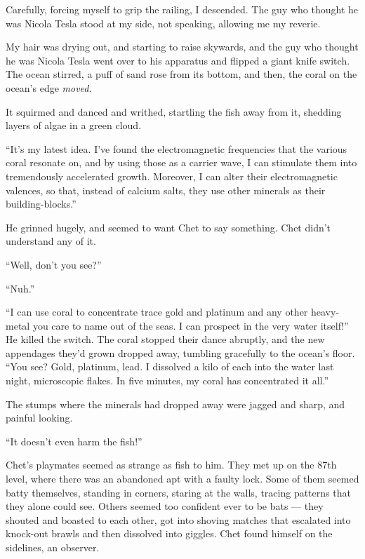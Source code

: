 Carefully, forcing myself to grip the railing, I descended. The guy
who thought he was Nicola Tesla stood at my side, not speaking,
allowing me my reverie.

My hair was drying out, and starting to raise skywards, and the guy
who thought he was Nicola Tesla went over to his apparatus and
flipped a giant knife switch. The ocean stirred, a puff of sand
rose from its bottom, and then, the coral on the ocean's edge
\emph{moved}.

It squirmed and danced and writhed, startling the fish away from
it, shedding layers of algae in a green cloud.

``It's my latest idea. I've found the electromagnetic frequencies that the 
various coral resonate on, and by using those as a carrier wave, I can 
stimulate them into tremendously accelerated growth. Moreover, I can alter 
their electromagnetic valences, so that, instead of calcium salts, they use 
other minerals as their building-blocks.''

He grinned hugely, and seemed to want Chet to say something. Chet
didn't understand any of it.

``Well, don't you see?''

``Nuh.''

``I can use coral to concentrate trace gold and platinum and any other 
heavy-metal you care to name out of the seas. I can prospect in the very water 
itself!''
He killed the switch. The coral stopped their dance abruptly, and
the new appendages they'd grown dropped away, tumbling gracefully
to the ocean's floor.
``You see? Gold, platinum, lead. I dissolved a kilo of each into the water last 
night, microscopic flakes. In five minutes, my coral has concentrated it all.''

The stumps where the minerals had dropped away were jagged and
sharp, and painful looking.

``It doesn't even harm the fish!''

\tb

Chet's playmates seemed as strange as fish to him. They met up on
the 87th level, where there was an abandoned apt with a faulty
lock. Some of them seemed batty themselves, standing in corners,
staring at the walls, tracing patterns that they alone could see.
Others seemed too confident ever to be bats --- they shouted and
boasted to each other, got into shoving matches that escalated into
knock-out brawls and then dissolved into giggles. Chet found
himself on the sidelines, an observer.

